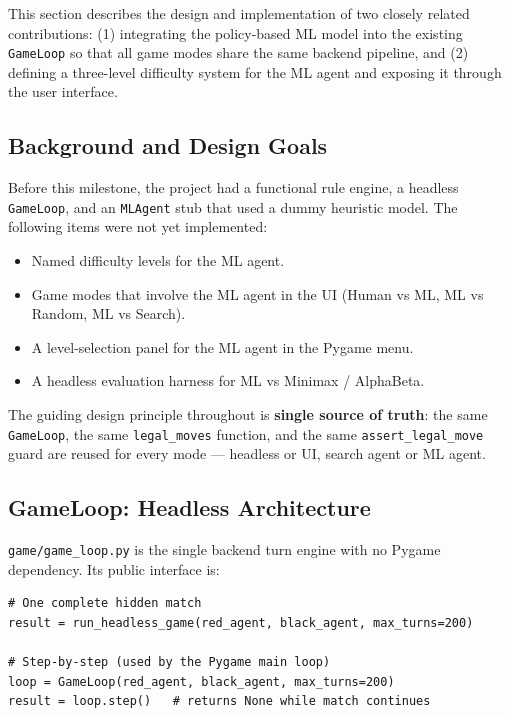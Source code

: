 This section describes the design and implementation of two closely
related contributions: (1) integrating the policy-based ML model into
the existing \texttt{GameLoop} so that all game modes share the same
backend pipeline, and (2) defining a three-level difficulty system for
the ML agent and exposing it through the user interface.

\subsection{Background and Design Goals}
\label{sec:integration-background}

Before this milestone, the project had a functional rule engine,
a headless \texttt{GameLoop}, and an \texttt{MLAgent} stub that used a
dummy heuristic model.  The following items were not yet implemented:

\begin{itemize}
  \item Named difficulty levels for the ML agent.
  \item Game modes that involve the ML agent in the UI (Human vs ML,
        ML vs Random, ML vs Search).
  \item A level-selection panel for the ML agent in the Pygame menu.
  \item A headless evaluation harness for ML vs Minimax / AlphaBeta.
\end{itemize}

The guiding design principle throughout is \textbf{single source of
truth}: the same \texttt{GameLoop}, the same \texttt{legal\_moves}
function, and the same \texttt{assert\_legal\_move} guard are reused
for every mode — headless or UI, search agent or ML agent.

\subsection{GameLoop: Headless Architecture}
\label{sec:gameloop}

\texttt{game/game\_loop.py} is the single backend turn engine with no
Pygame dependency.  Its public interface is:

\begin{lstlisting}[caption={GameLoop public API}]
# One complete hidden match
result = run_headless_game(red_agent, black_agent, max_turns=200)

# Step-by-step (used by the Pygame main loop)
loop = GameLoop(red_agent, black_agent, max_turns=200)
result = loop.step()   # returns None while match continues
\end{lstlisting}


